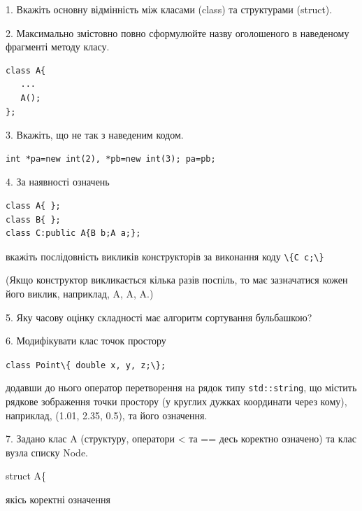 \documentclass[12pt, ukrainian]{article}
\def\code#1{\Verb!#1!}
\begin{document}
{%
1. Вкажіть основну відмінність між класами (class) та структурами (struct).%
\par
\vspace{2mm}
2. Максимально змістовно повно сформулюйте назву оголошеного в наведеному фрагменті методу класу.
\vspace{-3mm}
\begin{verbatim}class A{
   ...
   A();
};\end{verbatim}
\vspace{-3mm}
\par
\vspace{2mm}
3. Вкажіть, що не так з наведеним кодом.
\vspace{-3mm}
\begin{verbatim}int *pa=new int(2), *pb=new int(3); pa=pb;\end{verbatim}
\vspace{-3mm}
\par
\vspace{2mm}
4. За наявності означень
\vspace{-3mm}
\begin{verbatim}
class A{ };
class B{ };
class C:public A{B b;A a;};\end{verbatim}
\vspace{-3mm}
вкажіть послідовність викликів конструкторів за виконання коду \code{\{C c;\}} 

(Якщо конструктор викликається кілька разів поспіль, то має зазначатися кожен його виклик, наприклад, A, A, A.)

\vspace{2mm}
5. Яку часову оцінку складності має алгоритм сортування бульбашкою?
\par
\vspace{2mm}
6. Модифікувати клас точок простору 

\qquad\code{class Point\{ double x, y, z;\};}


додавши до нього оператор перетворення на рядок типу \code{std::string}, що містить рядкове зображення точки простору (у круглих дужках координати через кому), наприклад, (1.01, 2.35, 0.5), та його означення.%
\par
\vspace{2mm}
7. 
Задано клас A (структуру, оператори < та == десь коректно означено) та клас вузла списку Node.

struct A\{

\quad  якісь коректні означення 

}
\end{document}
